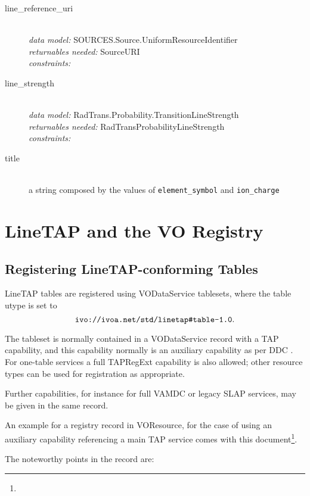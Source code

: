 \documentclass[11pt,a4paper]{ivoa}
\begin{document}
\begin{description}
	\item [line\_reference\_uri]\hfill\\
	\textit{data model:} SOURCES.Source.UniformResourceIdentifier\\
	\textit{returnables needed:} SourceURI\\
	\textit{constraints:}

	\item [line\_strength]\hfill\\
	\textit{data model:} RadTrans.Probability.TransitionLineStrength\\
	\textit{returnables needed:} RadTransProbabilityLineStrength\\
        \textit{constraints:}

\item [title]\hfill\\
	a string composed by the values of  \texttt{element\_symbol} and \texttt{ion\_charge}


\end{description}

\section{LineTAP and the VO Registry}

\subsection{Registering LineTAP-conforming Tables}

LineTAP tables are registered using VODataService
\citep{2010ivoa.spec.1202P} tablesets, where the table utype is set to
$$\hbox{\verb|ivo://ivoa.net/std/linetap#table-1.0|}.$$

The tableset is normally contained in a VODataService 
record with a TAP capability, and this capability normally is an auxiliary
capability as per DDC \citep{2019ivoa.rept.0520D}.  For one-table
services a full TAPRegExt \citep{2012ivoa.spec.0827D} capability is also
allowed; other resource types can be used for registration as
appropriate.

Further capabilities, for instance for full VAMDC or legacy SLAP
services, may be given in the same record.

An example for a registry record in VOResource, for the case of
using an auxiliary capability referencing a main TAP service comes with
this document\footnote{}.

The noteworthy points in the record are:
\end{document}
